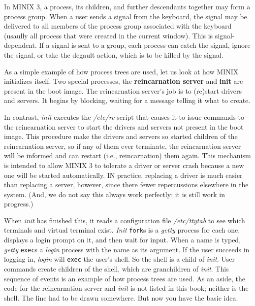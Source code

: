\documentclass{book}
\newcommand {\kw}  [1] {\textbf{#1}}
\newcommand {\sys} [1] {\textsl{#1}}
\newcommand {\cmd} [1] {\texttt{#1}}
\begin{document}
In MINIX 3, a process, its children, and further descendants together may form a process group.
When a user sends a signal from the keyboard, the signal may be delivered to all members of the process group
associated with the keyboard (usaully all process that were created in the current window).
This is signal-dependent.
If a signal is sent to a group, each process can catch the signal, ignore the signal, or take the degault action,
which is to be killed by the signal.

As a simple example of how process trees are used, let us look at how MINIX initializes itself.
Two special processes, the \kw{reincarnation server} and \kw{init} are present in the boot image.
The reincarnation server's job is to (re)start drivers and servers.
It begins by blocking, waiting for a message telling it what to create.

In contrast, \sys{init} executes the \sys{/etc/rc} script that causes it to issue commands to the reincarnation server
to start the drivers and servers not present in the boot image.
This procedure make the drivers and servers so started children of the reincarnation server,
so if any of them ever terminate, the reincarnation server will be informed and can restart (i.e., reincarnation) them again.
This mechanism is intended to allow MINIX 3 to tolerate a driver or server crash because a new one will be started automatically.
IN practice, replacing a driver is much easier than replacing a server, however,
since there fewer repercussions elsewhere in the system.
(And, we do not say this always work perfectly; it is still work in progress.)

When \sys{init} has finished this, it reads a configuration file \sys{/etc/ttytab} to see which terminals and virtual terminal exist.
\sys{Init} \cmd{fork}s is a \sys{getty} process for each one, displays a login prompt on it, and then wait for input.
When a name is typed, \sys{getty} \cmd{exec}s a \sys{login} process with the name as its argument.
If the user succeeds in logging in, \sys{login} will \cmd{exec} the user's shell.
So the shell is a child of \sys{init}.
User commands create children of the shell, which are granchildren of \sys{init}.
This sequence of events is an example of how process trees are used.
As an aside, the code for the reincarnation server and \sys{init} is not listed in this book; neither is the shell.
The line had to be drawn somewhere.
But now you have the basic idea.
\end{document}
